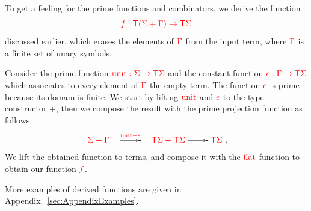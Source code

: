 

\noindent\begin{example}\label{ex:filter} 
 To get a feeling for the prime functions and combinators, we derive the function
$$ {\color{red}{f:{\color{red}{\mathsf T}}({\color{red}{\Sigma}}+{\color{red}{\Gamma}})\to{\color{red}{\mathsf T}}{\color{red}{\Sigma}}}}$$
discussed earlier, which erases the elements of ${\color{red}{\Gamma}}$ from the input term, where ${\color{red}{\Gamma}}$ is a finite set of unary symbols. 

Consider the prime function ${\color{red}{{\color{red}{\mathrm{unit}}}:{\color{red}{\Sigma}}\to{\color{red}{\mathsf T}}{\color{red}{\Sigma}}}}$ and the constant function ${\color{red}{\epsilon:{\color{red}{\Gamma}}\to{\color{red}{\mathsf T}}{\color{red}{\Sigma}}}}$ which associates to every element of ${\color{red}{\Gamma}}$ the empty term. The function ${\color{red}{\epsilon}}$ is prime because its domain is finite. We start by lifting ${\color{red}{{\color{red}{\mathrm{unit}}}}}$ and ${\color{red}{\epsilon}}$ to the type constructor $+$, then we compose the result with the prime projection function as follows
\begin{align*}
\xymatrix{
    \ranked{\rSigma+\rGamma}\quad \ar[r]^-{\ranked{\unit+\epsilon}} & \quad \ranked{\tmonad\rSigma+\tmonad\rSigma}\ar[r]^-{} &\tmonad\rSigma
},
\end{align*}
We lift the obtained function to terms, and compose it with the ${\color{red}{\mathrm{flat}}}$ function to obtain our function ${\color{red}{f}}$.  
\end{example}

More examples of derived functions are given in Appendix.~\ref{sec:AppendixExamples}.

